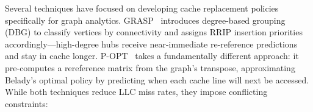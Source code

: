 \documentclass[conference]{IEEEtran}
\begin{document}


    


Several techniques have focused on developing cache replacement policies specifically for graph analytics. GRASP~\cite{faldu_domain-specialized_2020,faldu_closer_2020} introduces degree-based grouping (DBG) to classify vertices by connectivity and assigns RRIP insertion priorities accordingly---high-degree hubs receive near-immediate re-reference predictions and stay in cache longer. P-OPT~\cite{balaji_p-opt_2021} takes a fundamentally different approach: it pre-computes a rereference matrix from the graph's transpose, approximating Belady's optimal policy by predicting when each cache line will next be accessed. While both techniques reduce LLC miss rates, they impose conflicting constraints:
\end{document}
